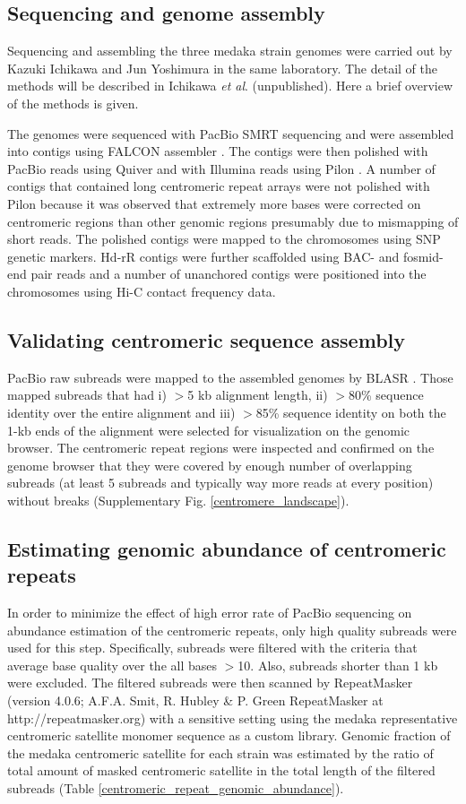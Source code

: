\subsection*{Sequencing and genome assembly}
  Sequencing and assembling the three medaka strain genomes were carried out by Kazuki Ichikawa and Jun Yoshimura in the same laboratory. The detail of the methods will be described in Ichikawa \textit{et al}. (unpublished). Here a brief overview of the methods is given.

  The genomes were sequenced with PacBio SMRT sequencing and were assembled into contigs using FALCON assembler \cite{Chin2016}. The contigs were then polished with PacBio reads using Quiver \cite{Chin2013} and with Illumina reads using Pilon \cite{Walker2014}. A number of contigs that contained long centromeric repeat arrays were not polished with Pilon because it was observed that extremely more bases were corrected on centromeric regions than other genomic regions presumably due to mismapping of short reads. The polished contigs were mapped to the chromosomes using SNP genetic markers. Hd-rR contigs were further scaffolded using BAC- and fosmid-end pair reads and a number of unanchored contigs were positioned into the chromosomes using Hi-C contact frequency data.


\subsection*{Validating centromeric sequence assembly}
  PacBio raw subreads were mapped to the assembled genomes by BLASR \cite{Chaisson2012}. Those mapped subreads that had i) $>$5 kb alignment length, ii) $>$80\% sequence identity over the entire alignment and iii) $>$85\% sequence identity on both the 1-kb ends of the alignment were selected for visualization on the genomic browser. The centromeric repeat regions were inspected and confirmed on the genome browser that they were covered by enough number of overlapping subreads (at least 5 subreads and typically way more reads at every position) without breaks (Supplementary Fig. \ref{centromere_landscape}).


\subsection*{Estimating genomic abundance of centromeric repeats}
  In order to minimize the effect of high error rate of PacBio sequencing on abundance estimation of the centromeric repeats, only high quality subreads were used for this step. Specifically, subreads were filtered with the criteria that average base quality over the all bases $>$10. Also, subreads shorter than 1 kb were excluded. The filtered subreads were then scanned by RepeatMasker (version 4.0.6; A.F.A. Smit, R. Hubley & P. Green RepeatMasker at http://repeatmasker.org) with a sensitive setting using the medaka representative centromeric satellite monomer sequence as a custom library. Genomic fraction of the medaka centromeric satellite for each strain was estimated by the ratio of total amount of masked centromeric satellite in the total length of the filtered subreads (Table \ref{centromeric_repeat_genomic_abundance}).


